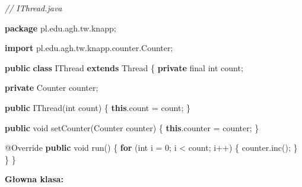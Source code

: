 \documentclass[11pt]{article}
\newenvironment{Shaded}{}{}
\newcommand{\KeywordTok}[1]{\textcolor[rgb]{0.00,0.44,0.13}{\textbf{{#1}}}}
\newcommand{\DataTypeTok}[1]{\textcolor[rgb]{0.56,0.13,0.00}{{#1}}}
\newcommand{\DecValTok}[1]{\textcolor[rgb]{0.25,0.63,0.44}{{#1}}}
\newcommand{\CommentTok}[1]{\textcolor[rgb]{0.38,0.63,0.69}{\textit{{#1}}}}
\newcommand{\FunctionTok}[1]{\textcolor[rgb]{0.02,0.16,0.49}{{#1}}}
\newcommand{\NormalTok}[1]{{#1}}
\newcommand{\ImportTok}[1]{{#1}}
\newcommand{\ControlFlowTok}[1]{\textcolor[rgb]{0.00,0.44,0.13}{\textbf{{#1}}}}
\newcommand{\OperatorTok}[1]{\textcolor[rgb]{0.40,0.40,0.40}{{#1}}}
\newcommand{\BuiltInTok}[1]{{#1}}
\newcommand{\AttributeTok}[1]{\textcolor[rgb]{0.49,0.56,0.16}{{#1}}}
\begin{document}
\begin{Shaded}
\begin{Highlighting}[]
\CommentTok{// IThread.java}

\KeywordTok{package}\ImportTok{ pl}\OperatorTok{.}\ImportTok{edu}\OperatorTok{.}\ImportTok{agh}\OperatorTok{.}\ImportTok{tw}\OperatorTok{.}\ImportTok{knapp}\OperatorTok{;}

\KeywordTok{import} \ImportTok{pl}\OperatorTok{.}\ImportTok{edu}\OperatorTok{.}\ImportTok{agh}\OperatorTok{.}\ImportTok{tw}\OperatorTok{.}\ImportTok{knapp}\OperatorTok{.}\ImportTok{counter}\OperatorTok{.}\ImportTok{Counter}\OperatorTok{;}

\KeywordTok{public} \KeywordTok{class}\NormalTok{ IThread }\KeywordTok{extends} \BuiltInTok{Thread} \OperatorTok{\{}
    \KeywordTok{private} \DataTypeTok{final} \DataTypeTok{int}\NormalTok{ count}\OperatorTok{;}

    \KeywordTok{private}\NormalTok{ Counter counter}\OperatorTok{;}

    \KeywordTok{public} \FunctionTok{IThread}\OperatorTok{(}\DataTypeTok{int}\NormalTok{ count}\OperatorTok{)} \OperatorTok{\{}
        \KeywordTok{this}\OperatorTok{.}\FunctionTok{count} \OperatorTok{=}\NormalTok{ count}\OperatorTok{;}
    \OperatorTok{\}}

    \KeywordTok{public} \DataTypeTok{void} \FunctionTok{setCounter}\OperatorTok{(}\NormalTok{Counter counter}\OperatorTok{)} \OperatorTok{\{}
        \KeywordTok{this}\OperatorTok{.}\FunctionTok{counter} \OperatorTok{=}\NormalTok{ counter}\OperatorTok{;}
    \OperatorTok{\}}

    \AttributeTok{@Override}
    \KeywordTok{public} \DataTypeTok{void} \FunctionTok{run}\OperatorTok{()} \OperatorTok{\{}
        \ControlFlowTok{for} \OperatorTok{(}\DataTypeTok{int}\NormalTok{ i }\OperatorTok{=} \DecValTok{0}\OperatorTok{;}\NormalTok{ i }\OperatorTok{\textless{}}\NormalTok{ count}\OperatorTok{;}\NormalTok{ i}\OperatorTok{++)} \OperatorTok{\{}
\NormalTok{            counter}\OperatorTok{.}\FunctionTok{inc}\OperatorTok{();}
        \OperatorTok{\}}
    \OperatorTok{\}}
\OperatorTok{\}}
\end{Highlighting}
\end{Shaded}

\textbf{Głowna klasa:}
\end{document}
